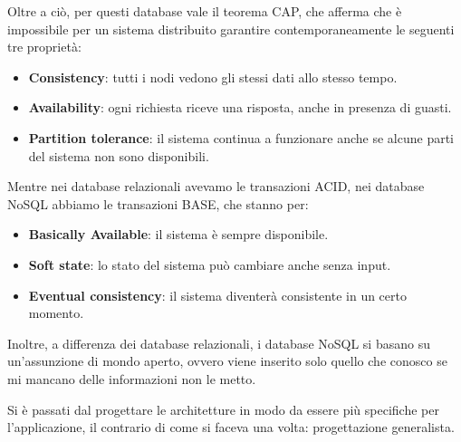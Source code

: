 Oltre a ciò, per questi database vale il teorema CAP, che afferma che è
impossibile per un sistema distribuito garantire contemporaneamente le seguenti
tre proprietà:
\begin{itemize}
    \item \textbf{Consistency}: tutti i nodi vedono gli stessi dati allo stesso
          tempo.
    \item \textbf{Availability}: ogni richiesta riceve una risposta, anche in
          presenza di guasti.
    \item \textbf{Partition tolerance}: il sistema continua a funzionare anche
          se alcune parti del sistema non sono disponibili.
\end{itemize}

Mentre nei database relazionali avevamo le transazioni ACID, nei database NoSQL
abbiamo le transazioni BASE, che stanno per:
\begin{itemize}
    \item \textbf{Basically Available}: il sistema è sempre disponibile.
    \item \textbf{Soft state}: lo stato del sistema può cambiare anche senza
          input.
    \item \textbf{Eventual consistency}: il sistema diventerà consistente in un
          certo momento.
\end{itemize}

Inoltre, a differenza dei database relazionali, i database NoSQL si basano su 
un'assunzione di mondo aperto, ovvero viene inserito solo quello che conosco se 
mi mancano delle informazioni non le metto.

Si è passati dal progettare le architetture in modo da essere più specifiche
per l'applicazione, il contrario di come si faceva una volta: progettazione generalista.
